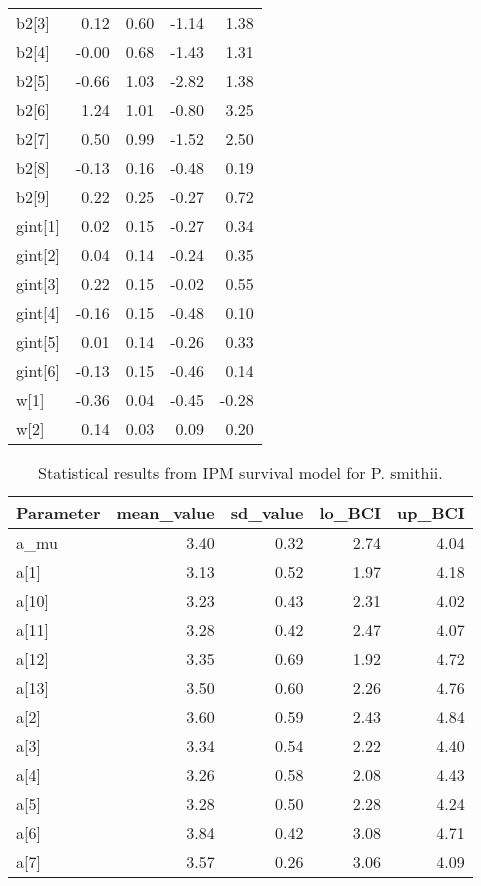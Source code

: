 \documentclass[12pt,]{article}
\begin{document}
\begin{table}[ht]
{\begin{tabular}{lrrrr}
  b2[3] & 0.12 & 0.60 & -1.14 & 1.38 \\ 
  b2[4] & -0.00 & 0.68 & -1.43 & 1.31 \\ 
  b2[5] & -0.66 & 1.03 & -2.82 & 1.38 \\ 
  b2[6] & 1.24 & 1.01 & -0.80 & 3.25 \\ 
  b2[7] & 0.50 & 0.99 & -1.52 & 2.50 \\ 
  b2[8] & -0.13 & 0.16 & -0.48 & 0.19 \\ 
  b2[9] & 0.22 & 0.25 & -0.27 & 0.72 \\ 
  gint[1] & 0.02 & 0.15 & -0.27 & 0.34 \\ 
  gint[2] & 0.04 & 0.14 & -0.24 & 0.35 \\ 
  gint[3] & 0.22 & 0.15 & -0.02 & 0.55 \\ 
  gint[4] & -0.16 & 0.15 & -0.48 & 0.10 \\ 
  gint[5] & 0.01 & 0.14 & -0.26 & 0.33 \\ 
  gint[6] & -0.13 & 0.15 & -0.46 & 0.14 \\ 
  w[1] & -0.36 & 0.04 & -0.45 & -0.28 \\ 
  w[2] & 0.14 & 0.03 & 0.09 & 0.20 \\ 
   \hline
\end{tabular}
}
\end{table}\begin{table}[ht]
\centering
\caption{Statistical results from IPM survival model for P. smithii.} 
{\footnotesize
\begin{tabular}{lrrrr}
  \hline
Parameter & mean\_value & sd\_value & lo\_BCI & up\_BCI \\ 
  \hline
a\_mu & 3.40 & 0.32 & 2.74 & 4.04 \\ 
  a[1] & 3.13 & 0.52 & 1.97 & 4.18 \\ 
  a[10] & 3.23 & 0.43 & 2.31 & 4.02 \\ 
  a[11] & 3.28 & 0.42 & 2.47 & 4.07 \\ 
  a[12] & 3.35 & 0.69 & 1.92 & 4.72 \\ 
  a[13] & 3.50 & 0.60 & 2.26 & 4.76 \\ 
  a[2] & 3.60 & 0.59 & 2.43 & 4.84 \\ 
  a[3] & 3.34 & 0.54 & 2.22 & 4.40 \\ 
  a[4] & 3.26 & 0.58 & 2.08 & 4.43 \\ 
  a[5] & 3.28 & 0.50 & 2.28 & 4.24 \\ 
  a[6] & 3.84 & 0.42 & 3.08 & 4.71 \\ 
  a[7] & 3.57 & 0.26 & 3.06 & 4.09 \\ 

\end{tabular}}
\end{table}
\end{document}
